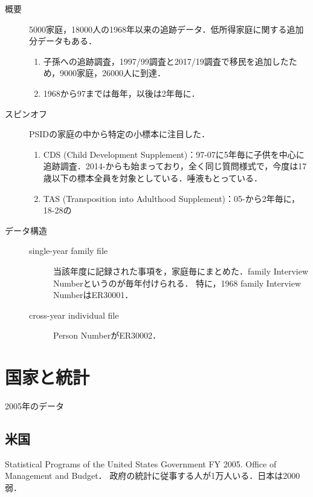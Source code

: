 \documentclass[uplatex,dvipdfmx]{jsreport}
\begin{document}
\begin{description}
    \item[概要] 5000家庭，18000人の1968年以来の追跡データ．低所得家庭に関する追加分データもある．
    \begin{enumerate}
        \item 子孫への追跡調査，1997/99調査と2017/19調査で移民を追加したため，9000家庭，26000人に到達．
        \item 1968から97までは毎年，以後は2年毎に．
    \end{enumerate}
    \item[スピンオフ] PSIDの家庭の中から特定の小標本に注目した．
    \begin{enumerate}
        \item CDS (Child Development Supplement)：97-07に5年毎に子供を中心に追跡調査．2014-からも始まっており，全く同じ質問様式で，今度は17歳以下の標本全員を対象としている．唾液もとっている．
        \item TAS (Transposition into Adulthood Supplement)：05-から2年毎に，18-28の
    \end{enumerate}
    \item[データ構造] \begin{description}
        \item[single-year family file] 当該年度に記録された事項を，家庭毎にまとめた．family Interview Numberというのが毎年付けられる．
        特に，1968 family Interview NumberはER30001．
        \item[cross-year individual file] Person NumberがER30002．
    \end{description}
\end{description}


\section{国家と統計}

\begin{tcolorbox}[colframe=ForestGreen, colback=ForestGreen!10!white,breakable,colbacktitle=ForestGreen!40!white,coltitle=black,fonttitle=\bfseries\sffamily,
title=]
    2005年のデータ
\end{tcolorbox}

\subsection{米国}

\begin{tcolorbox}[colframe=ForestGreen, colback=ForestGreen!10!white,breakable,colbacktitle=ForestGreen!40!white,coltitle=black,fonttitle=\bfseries\sffamily,
title=]
    Statistical Programs of the United States Government FY 2005. Office of Management and Budget．
    政府の統計に従事する人が1万人いる．日本は2000弱．
\end{tcolorbox}
\end{document}
